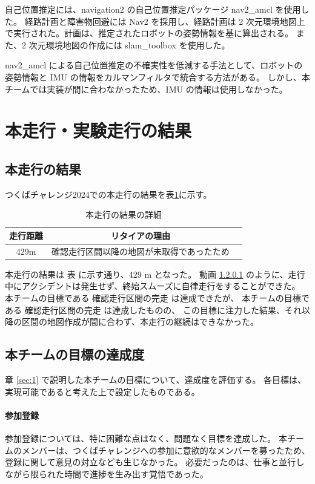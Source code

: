 \documentclass[twocolumn,9pt]{jsproceedings}
\begin{document}
自己位置推定には、navigation2 の自己位置推定パッケージ nav2\_amcl \cite{nav2_amcl} を使用した。
経路計画と障害物回避には Nav2 \cite{nav2} を採用し、経路計画は 2 次元環境地図上で実行された。計画は、推定されたロボットの姿勢情報を基に算出される。
また、2 次元環境地図の作成には slam\_toolbox \cite{slam_toolbox} を使用した。

nav2\_amcl による自己位置推定の不確実性を低減する手法として、ロボットの姿勢情報と IMU の情報をカルマンフィルタで統合する方法がある。
しかし、本チームでは実装が間に合わなかったため、IMU の情報は使用しなかった。

\section{本走行・実験走行の結果}
\subsection{本走行の結果}

つくばチャレンジ2024での本走行の結果を表\ref{MainRun}に示す。

\begin{table}[H]
  \caption{本走行の結果の詳細}
  \label{MainRun}
  \begin{tabular}{|c|c|p{4.0cm}|}
    \hline
    走行距離 & リタイアの理由 \\
    \hline
    429m   & 確認走行区間以降の地図が未取得であったため \\
    \hline
  \end{tabular}
\end{table}

本走行の結果は 表 に示す通り、429 m となった。
動画 \ref{} のように、走行中にアクシデントは発生せず、終始スムーズに自律走行をすることができた。
本チームの目標である 確認走行区間の完走 は達成できたが、
本チームの目標である 確認走行区間の完走 は達成したものの、
この目標に注力した結果、それ以降の区間の地図作成が間に合わず、本走行の継続はできなかった。

\subsection{本チームの目標の達成度}

章 \ref{sec:1} で説明した本チームの目標について、達成度を評価する。
各目標は、実現可能であると考えた上で設定したものである。

\paragraph{参加登録}
参加登録については、特に困難な点はなく、問題なく目標を達成した。
本チームのメンバーは、つくばチャレンジへの参加に意欲的なメンバーを募ったため、登録に関して意見の対立なども生じなかった。
必要だったのは、仕事と並行しながら限られた時間で進捗を生み出す覚悟であった。
\end{document}
